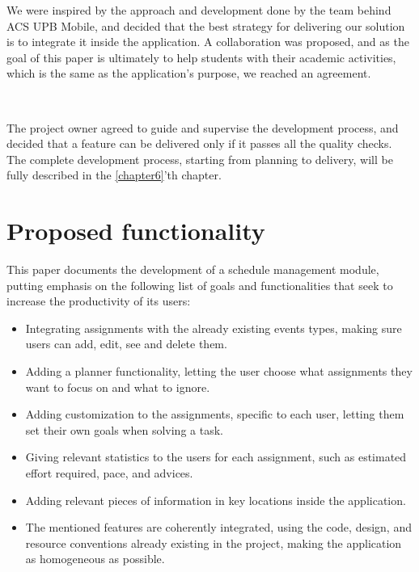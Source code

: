 We were inspired by the approach and development done by the team behind ACS UPB Mobile, and decided that the best strategy for delivering our solution is to integrate it inside the application.
A collaboration was proposed, and as the goal of this paper is ultimately to help students with their academic activities, which is the same as the application’s purpose, we reached an agreement.

~

The project owner agreed to guide and supervise the development process, and decided that a feature can be delivered only if it passes all the quality checks. The complete development process, starting from planning to delivery, will be fully described in the \ref{chapter6}'th chapter. 




\section{Proposed functionality} \label{1:proposedfunctionalities}

This paper documents the development of a schedule management module, putting emphasis on the following list of goals and functionalities that seek to increase the productivity of its users:

\begin{itemize}
            \setlength{\topsep}{0.5pt}
            \setlength{\itemsep}{0.5pt}
            \setlength{\parsep}{0.5pt}
            \item Integrating assignments with the already existing events types, making sure users can add, edit, see and delete them.
            \item Adding a planner functionality, letting the user choose what assignments they want to focus on and what to ignore.
            \item Adding customization to the assignments, specific to each user, letting them set their own goals when solving a task.
            \item Giving relevant statistics to the users for each assignment, such as estimated effort required, pace, and advices.
            \item Adding relevant pieces of information in key locations inside the application.
            \item The mentioned features are coherently integrated, using the code, design, and resource conventions already existing in the project, making the application as homogeneous as possible.
        \end{itemize}


